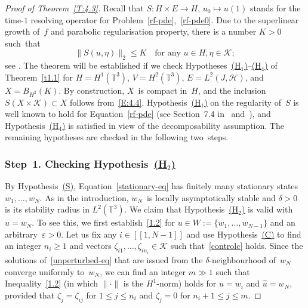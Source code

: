 \documentclass[JEP,XML,SOM,Unicode,ThmDefs]{cedram}
\let\mathcal\mathscr
\theoremstyle{plain}
\numberwithin{equation}{section}
\let\e\varepsilon
\newcommand{\T}{{\mathbb T}}
\newcommand{\HH}{{\mathcal H}}
\newcommand{\KK}{{\mathcal K}}
\begin{document}
\begin{proof}[Proof of Theorem~\ref{T:4.3}]
Recall that $S:H\times E\to H$, $u_0\mapsto u(1)$ stands for the time-$1$ resolving operator for Problem~\eqref{rf-pde},~\eqref{rf-pde0}. Due to the superlinear growth of~$f$ and parabolic regularisation property, there is a number $K>0$ such~that
\begin{equation}\label{E:4.4}
\|S(u,\eta)\|_2\le K \quad \text{for any } u\in H, \eta\in \KK;
\end{equation}
see \cite[Lem.\,2.10]{JNPS-cmp2014}. The theorem will be established if we check Hypotheses~\hyperlink{H1}{(H$_1$)}--\hyperlink{H4}{(H$_4$)} of Theorem~\ref{t1.1} for $H=H^1(\T^3)$, $V=H^2(\T^3)$, $E=L^2(J,\HH)$, and $X=B_{H^2}(K)$. By construction, $X$~is compact in~$H$, and the inclusion $S(X\times\KK)\subset X$ follows from~\eqref{E:4.4}. Hypothesis~\hyperlink{H1}{(H$_1$)} on the regularity of~$S$ is well known to hold for Equation~\eqref{rf-pde} (\eg see Section~7.4 in~\cite{KNS-2020} and~\cite{kuksin-1982}), and Hypothesis~\hyperlink{H4}{(H$_4$)} is satisfied in view of the decomposability assumption. The remaining hypotheses are checked in the following two~steps.

\subsubsection*{Step~1. Checking Hypothesis~\protect\hyperlink{H2}{\rm(H$_2$)}} By Hypothesis~\hyperlink{S}{\rm(S)}, Equation~\eqref{stationary-eq} has finitely many stationary states $w_1, \ldots, w_N$. As in the introduction, $w_N$~is locally asymptotically stable and $\delta>0$ is its stability radius in $L^2(\T^3)$. We claim that Hypothesis~\hyperlink{H2}{(H$_2$)} is valid with $\hat u=w_N$. To see this, we first establish~\eqref{1.2} for $u\in W:=\{w_1,\ldots,w_{N-1}\}$ and an arbitrary~$\e>0$. Let us fix any $i\in[\![1,N-1]\!]$ and use Hypothesis~\hyperlink{C}{(C)} to find an integer $n_i\ge1$ and vectors $\zeta_{i1},\dots,\zeta_{in_i}\in\KK$ such that~\eqref{controlc} holds. Since the solutions of~\eqref{unperturbed-eq} that are issued from the $\delta$-neighbourhood of~$w_N$ converge uniformly to~$w_N$, we can find an integer $m\gg1$ such that Inequality~\eqref{1.2} (in which $\|\cdot\|$ is the $H^1$-norm) holds for $u=w_i$ and $\hat u=w_N$, provided that $\zeta_j=\zeta_{ij}$ for $1\le j\le n_i$ and $\zeta_j=0$ for $n_i+1\le j\le m$.


\end{proof}
\end{document}

